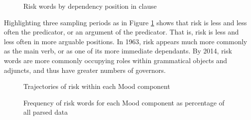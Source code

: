 			\begin{figure}[htb!]
			\centering
			\caption{Risk words by dependency position in clause}
			\label{fig:depnum}
			\end{figure}
			Highlighting three sampling periods as in Figure \ref{fig:depnum} shows that risk is less and less often the predicator, or an argument of the predicator. That is, risk is less and less often in more arguable positions. In 1963, risk appears much more commonly as the main verb, or as one of its more immediate dependants. By 2014, risk words are more commonly occupying roles within grammatical objects and adjuncts, and thus have greater numbers of governors.%

			\begin{figure}[htb!]
			\centering
			\caption{Trajectories of risk within each Mood component}
			\label{fig:interpersonalarg}
			\end{figure}

			\begin{figure}[htb!]
			\centering
			\caption{Frequency of risk words for each Mood component as percentage of all parsed data}
			\label{fig:reladj}
			\end{figure}

